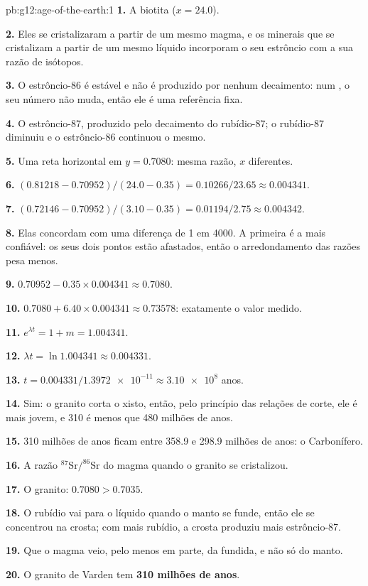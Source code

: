 \begin{solution}{pb:g12:age-of-the-earth:1}
\textbf{1.} A biotita ($x = 24.0$).

\textbf{2.} Eles se cristalizaram a partir de um mesmo magma, e os minerais
que se cristalizam a partir de um mesmo líquido incorporam o seu estrôncio
com a sua razão de isótopos.

\textbf{3.} O estrôncio-86 é estável e não é produzido por nenhum
decaimento: num , o seu número não muda, então ele é uma
referência fixa.

\textbf{4.} O estrôncio-87, produzido pelo decaimento do rubídio-87; o
rubídio-87 diminuiu e o estrôncio-86 continuou o mesmo.

\textbf{5.} Uma reta horizontal em $y = 0.7080$: mesma razão, $x$ diferentes.

\textbf{6.} $(0.81218 - 0.70952)/(24.0 - 0.35) = 0.10266/23.65 \approx
0.004341$.

\textbf{7.} $(0.72146 - 0.70952)/(3.10 - 0.35) = 0.01194/2.75 \approx
0.004342$.

\textbf{8.} Elas concordam com uma diferença de 1 em 4000. A primeira é a
mais confiável: os seus dois pontos estão afastados, então o arredondamento
das razões pesa menos.

\textbf{9.} $0.70952 - 0.35 \times 0.004341 \approx 0.7080$.

\textbf{10.} $0.7080 + 6.40 \times 0.004341 \approx 0.73578$: exatamente o
valor medido.

\textbf{11.} $e^{\lambda t} = 1 + m = 1.004341$.

\textbf{12.} $\lambda t = \ln 1.004341 \approx 0.004331$.

\textbf{13.} $t = 0.004331/\num{1.3972e-11} \approx \num{3.10e8}$ anos.

\textbf{14.} Sim: o granito corta o xisto, então, pelo princípio das
relações de corte, ele é mais jovem, e 310 é menos que 480 milhões de
anos.

\textbf{15.} 310 milhões de anos ficam entre 358.9 e 298.9 milhões de anos:
o Carbonífero.

\textbf{16.} A razão $^{87}\mathrm{Sr}/^{86}\mathrm{Sr}$ do magma quando
o granito se cristalizou.

\textbf{17.} O granito: $0.7080 > 0.7035$.

\textbf{18.} O rubídio vai para o líquido quando o manto se funde, então ele
se concentrou na crosta; com mais rubídio, a crosta produziu mais
estrôncio-87.

\textbf{19.} Que o magma veio, pelo menos em parte, da 
fundida, e não só do manto.

\textbf{20.} O granito de Varden tem \textbf{310 milhões de anos}.
\end{solution}
